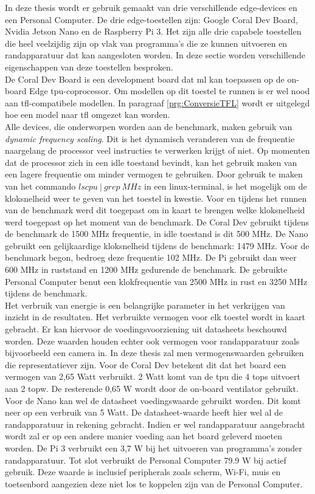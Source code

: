 In deze thesis wordt er gebruik gemaakt van drie verschillende edge-devices en een Personal Computer. De drie edge-toestellen zijn: Google Coral Dev Board, Nvidia Jetson Nano en de Raspberry Pi 3. Het zijn alle drie capabele toestellen die heel veelzijdig zijn op vlak van programma's die ze kunnen uitvoeren en randapparatuur dat kan aangesloten worden. In deze sectie worden verschillende eigenschappen van deze toestellen besproken. \\
De Coral Dev Board is een development board dat \gls{ml} kan toepassen op de on-board Edge \gls{tpu}-coprocessor. Om modellen op dit toestel te runnen is er wel nood aan \gls{tfl}-compatibele modellen. In paragraaf \ref{prg:ConversieTFL} wordt er uitgelegd hoe een model naar \gls{tfl} omgezet kan worden. \\
Alle devices, die onderworpen worden aan de benchmark, maken gebruik van \textit{dynamic frequency scaling}. Dit is het dynamisch veranderen van de frequentie naargelang de processor veel instructies te verwerken krijgt of niet. Op momenten dat de processor zich in een idle toestand bevindt, kan het gebruik maken van een lagere frequentie om minder vermogen te gebruiken. Door gebruik te maken van het commando $lscpu~|~grep~ MHz$ in een linux-terminal, is het mogelijk om de kloksnelheid weer te geven van het toestel in kwestie. Voor en tijdens het runnen van de benchmark werd dit toegepast om in kaart te brengen welke kloksnelheid werd toegepast op het moment van de benchmark. De Coral Dev gebruikt tijdens de benchmark de 1500 MHz frequentie, in idle toestand is dit 500 MHz. De Nano gebruikt een gelijkaardige kloksnelheid tijdens de benchmark: 1479 MHz. Voor de benchmark begon, bedroeg deze frequentie 102 MHz. De Pi gebruikt dan weer 600 MHz in ruststand en 1200 MHz gedurende de benchmark. De gebruikte Personal Computer benut een klokfrequentie van 2500 MHz in rust en 3250 MHz tijdens de benchmark. \\
Het verbruik van energie is een belangrijke parameter in het verkrijgen van inzicht in de resultaten. Het verbruikte vermogen voor elk toestel wordt in kaart gebracht. Er kan hiervoor de voedingsvoorziening uit datasheets beschouwd worden. Deze waarden houden echter ook vermogen voor randapparatuur zoals bijvoorbeeld een camera in. In deze thesis zal men vermogenswaarden gebruiken die representatiever zijn. Voor de Coral Dev betekent dit dat het board een vermogen van 2,65 Watt verbruikt. 2 Watt komt van de \gls{tpu} die 4 \gls{tops} uitvoert aan 2 \gls{topw}. De resterende 0,65 W wordt door de on-board ventilator gebruikt. Voor de Nano kan wel de datasheet voedingswaarde gebruikt worden. Dit komt neer op een verbruik van 5 Watt. De datasheet-waarde heeft hier wel al de randapparatuur in rekening gebracht. Indien er wel randapparatuur aangebracht wordt zal er op een andere manier voeding aan het board geleverd moeten worden. De Pi 3 verbruikt een 3,7 W bij het uitvoeren van programma's zonder randapparatuur. Tot slot verbruikt de Personal Computer 79.9 W bij actief gebruik. Deze waarde is inclusief peripherals zoals scherm, Wi-Fi, muis en toetsenbord aangezien deze niet los te koppelen zijn van de Personal Computer.\\
